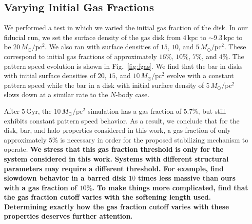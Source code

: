 \documentclass[twocolumn,linenumbers,trackchanges]{aastex631}
\newcommand{\Nbody}{$N$-body}
\newcommand{\Msun}{\ensuremath{M_{\odot}}}
\begin{document}
\subsection{Varying Initial Gas Fractions}
We performed a test in which we varied the initial gas fraction of the
disk. In our fiducial run, we set the surface density of the gas disk from
$4\,\textrm{kpc}$ to $\sim9.3\,\textrm{kpc}$ to be $20\,\Msun/\textrm{pc}^2$.
We also ran with surface densities of $15$, $10$, and
$5\,\Msun/\textrm{pc}^2$. These correspond to initial gas fractions of
approximately $16\%$, $10\%$, $7\%$, and $4\%$. The pattern speed evolution is
shown in Fig.~\ref{fig:fgas}. We find that the bar in disks with
initial surface densities of $20$, $15$, and $10\,\Msun/\textrm{pc}^2$ evolve
with a constant pattern speed while the bar in a disk with initial surface
density of $5\,\Msun/\textrm{pc}^2$ slows down at a similar rate to the \Nbody{} case.

After $5\,\textrm{Gyr}$, the $10\,\Msun/\textrm{pc}^2$ simulation has a gas
fraction of $5.7\%$, but still exhibits constant pattern speed behavior. As a
result, we conclude that for the disk, bar, and halo properties considered in
this work, a gas fraction of only approximately $5\%$ is necessary in order for
the proposed stabilizing mechanism to operate. {\bf We stress that this gas
fraction threshold is only for the system considered in this work. Systems with
different structural parameters may require a different threshold. For example,
\citet{2015MNRAS.454.3166A} find slowdown behavior in a barred disk $10$ times
less massive than ours with a gas fraction of $10\%$. To make things more
complicated, \citet{2010ApJ...719.1470V} find that the gas fraction cutoff
varies with the softening length used. Determining exactly how the gas fraction
cutoff varies with these properties deserves further attention.}
\end{document}
